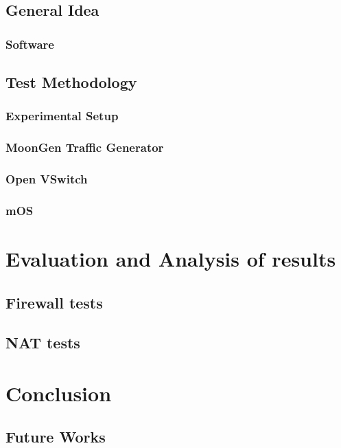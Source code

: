 \documentclass[11pt,a4paper,twoside,openright,bachelor,english]{netthesis}
\begin{document}
\section{General Idea}

\subsection{Software}

\section{Test Methodology}

\subsection{Experimental Setup}

\subsection{MoonGen Traffic Generator}

\subsection{Open VSwitch}

\subsection{mOS}

\chapter{Evaluation and Analysis of results}

\section{Firewall tests}

\section{NAT tests}

\chapter{Conclusion}

\section{Future Works}


%
\appendix
%

%





\end{document}
